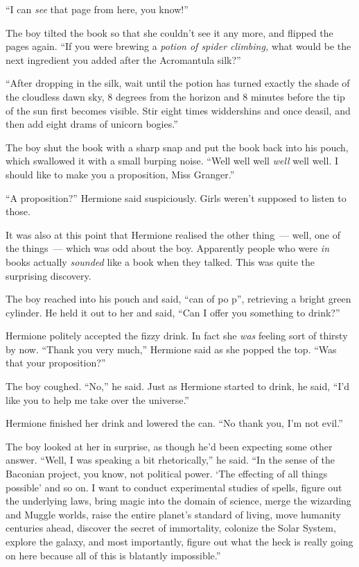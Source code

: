 ``I can \emph{see} that page from here, you know!''

The boy tilted the book so that she couldn't see it any more, and flipped the pages again. ``If you were brewing a \emph{potion of spider climbing,} what would be the next ingredient you added after the Acromantula silk?''

``After dropping in the silk, wait until the potion has turned exactly the shade of the cloudless dawn sky, 8 degrees from the horizon and 8 minutes before the tip of the sun first becomes visible. Stir eight times widdershins and once deasil, and then add eight drams of unicorn bogies.''

The boy shut the book with a sharp snap and put the book back into his pouch, which swallowed it with a small burping noise. ``Well well well \emph{well} well well. I should like to make you a proposition, Miss Granger.''

``A proposition?'' Hermione said suspiciously. Girls weren't supposed to listen to those.

It was also at this point that Hermione realised the other thing~--- well, one of the things~--- which was odd about the boy. Apparently people who were \emph{in} books actually \emph{sounded} like a book when they talked. This was quite the surprising discovery.

The boy reached into his pouch and said, ``can of po p'', retrieving a bright green cylinder. He held it out to her and said, ``Can I offer you something to drink?''

Hermione politely accepted the fizzy drink. In fact she \emph{was} feeling sort of thirsty by now. ``Thank you very much,'' Hermione said as she popped the top. ``Was that your proposition?''

The boy coughed. ``No,'' he said. Just as Hermione started to drink, he said, ``I'd like you to help me take over the universe.''

Hermione finished her drink and lowered the can. ``No thank you, I'm not evil.''

The boy looked at her in surprise, as though he'd been expecting some other answer. ``Well, I was speaking a bit rhetorically,'' he said. ``In the sense of the Baconian project, you know, not political power. `The effecting of all things possible' and so on. I want to conduct experimental studies of spells, figure out the underlying laws, bring magic into the domain of science, merge the wizarding and Muggle worlds, raise the entire planet's standard of living, move humanity centuries ahead, discover the secret of immortality, colonize the Solar System, explore the galaxy, and most importantly, figure out what the heck is really going on here because all of this is blatantly impossible.''

